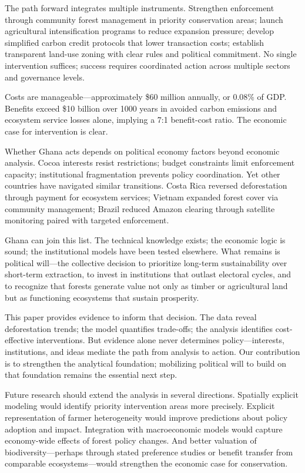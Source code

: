The path forward integrates multiple instruments. Strengthen enforcement through community forest management in priority conservation areas; launch agricultural intensification programs to reduce expansion pressure; develop simplified carbon credit protocols that lower transaction costs; establish transparent land-use zoning with clear rules and political commitment. No single intervention suffices; success requires coordinated action across multiple sectors and governance levels.

Costs are manageable—approximately \$60 million annually, or 0.08\% of GDP. Benefits exceed \$10 billion over 1000 years in avoided carbon emissions and ecosystem service losses alone, implying a 7:1 benefit-cost ratio. The economic case for intervention is clear.

Whether Ghana acts depends on political economy factors beyond economic analysis. Cocoa interests resist restrictions; budget constraints limit enforcement capacity; institutional fragmentation prevents policy coordination. Yet other countries have navigated similar transitions. Costa Rica reversed deforestation through payment for ecosystem services; Vietnam expanded forest cover via community management; Brazil reduced Amazon clearing through satellite monitoring paired with targeted enforcement.

Ghana can join this list. The technical knowledge exists; the economic logic is sound; the institutional models have been tested elsewhere. What remains is political will—the collective decision to prioritize long-term sustainability over short-term extraction, to invest in institutions that outlast electoral cycles, and to recognize that forests generate value not only as timber or agricultural land but as functioning ecosystems that sustain prosperity.

This paper provides evidence to inform that decision. The data reveal deforestation trends; the model quantifies trade-offs; the analysis identifies cost-effective interventions. But evidence alone never determines policy—interests, institutions, and ideas mediate the path from analysis to action. Our contribution is to strengthen the analytical foundation; mobilizing political will to build on that foundation remains the essential next step.

Future research should extend the analysis in several directions. Spatially explicit modeling would identify priority intervention areas more precisely. Explicit representation of farmer heterogeneity would improve predictions about policy adoption and impact. Integration with macroeconomic models would capture economy-wide effects of forest policy changes. And better valuation of biodiversity—perhaps through stated preference studies or benefit transfer from comparable ecosystems—would strengthen the economic case for conservation.

